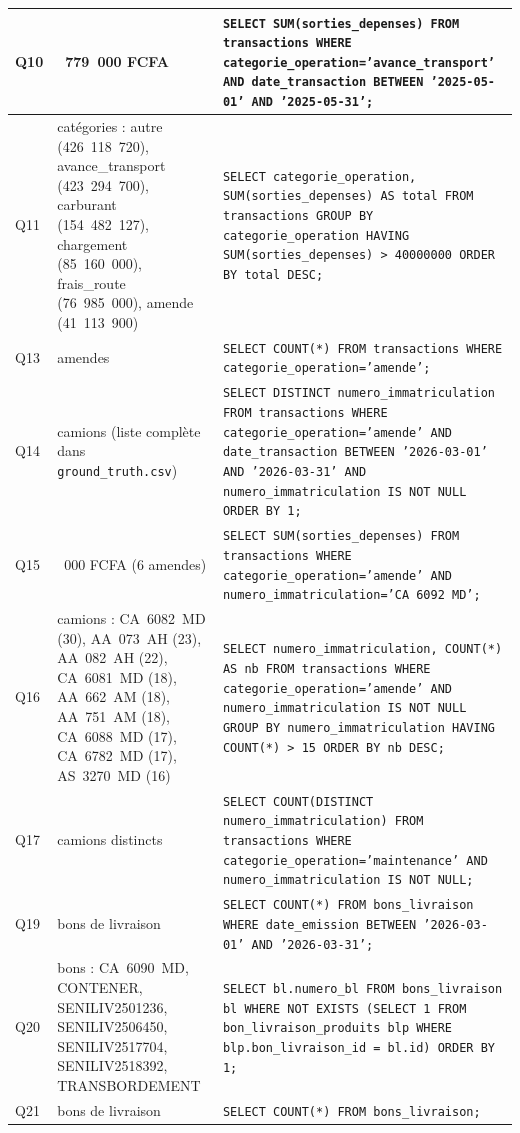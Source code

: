 {\begin{longtable}{|>{\raggedright\arraybackslash}p{0.8cm}|>{\raggedright\arraybackslash}p{4.2cm}|>{\raggedright\arraybackslash}p{8.8cm}|}
Q10 & 61~779~000 FCFA & \texttt{SELECT SUM(sorties\_depenses) FROM transactions WHERE categorie\_operation='avance\_transport' AND date\_transaction BETWEEN '2025-05-01' AND '2025-05-31';} \\ \hline
Q11 & 6 catégories : autre (426~118~720), avance\_transport (423~294~700), carburant (154~482~127), chargement (85~160~000), frais\_route (76~985~000), amende (41~113~900) & \texttt{SELECT categorie\_operation, SUM(sorties\_depenses) AS total FROM transactions GROUP BY categorie\_operation HAVING SUM(sorties\_depenses) > 40000000 ORDER BY total DESC;} \\ \hline
Q13 & 488 amendes & \texttt{SELECT COUNT(*) FROM transactions WHERE categorie\_operation='amende';} \\ \hline
Q14 & 30 camions (liste complète dans \texttt{ground\_truth.csv}) & \texttt{SELECT DISTINCT numero\_immatriculation FROM transactions WHERE categorie\_operation='amende' AND date\_transaction BETWEEN '2026-03-01' AND '2026-03-31' AND numero\_immatriculation IS NOT NULL ORDER BY 1;} \\ \hline
Q15 & 432~000 FCFA (6 amendes) & \texttt{SELECT SUM(sorties\_depenses) FROM transactions WHERE categorie\_operation='amende' AND numero\_immatriculation='CA 6092 MD';} \\ \hline
Q16 & 9 camions : CA~6082~MD (30), AA~073~AH (23), AA~082~AH (22), CA~6081~MD (18), AA~662~AM (18), AA~751~AM (18), CA~6088~MD (17), CA~6782~MD (17), AS~3270~MD (16) & \texttt{SELECT numero\_immatriculation, COUNT(*) AS nb FROM transactions WHERE categorie\_operation='amende' AND numero\_immatriculation IS NOT NULL GROUP BY numero\_immatriculation HAVING COUNT(*) > 15 ORDER BY nb DESC;} \\ \hline
Q17 & 65 camions distincts & \texttt{SELECT COUNT(DISTINCT numero\_immatriculation) FROM transactions WHERE categorie\_operation='maintenance' AND numero\_immatriculation IS NOT NULL;} \\ \hline
Q19 & 65 bons de livraison & \texttt{SELECT COUNT(*) FROM bons\_livraison WHERE date\_emission BETWEEN '2026-03-01' AND '2026-03-31';} \\ \hline
Q20 & 7 bons : CA~6090~MD, CONTENER, SENILIV2501236, SENILIV2506450, SENILIV2517704, SENILIV2518392, TRANSBORDEMENT & \texttt{SELECT bl.numero\_bl FROM bons\_livraison bl WHERE NOT EXISTS (SELECT 1 FROM bon\_livraison\_produits blp WHERE blp.bon\_livraison\_id = bl.id) ORDER BY 1;} \\ \hline
Q21 & 727 bons de livraison & \texttt{SELECT COUNT(*) FROM bons\_livraison;} \\ \hline

\end{longtable}}
